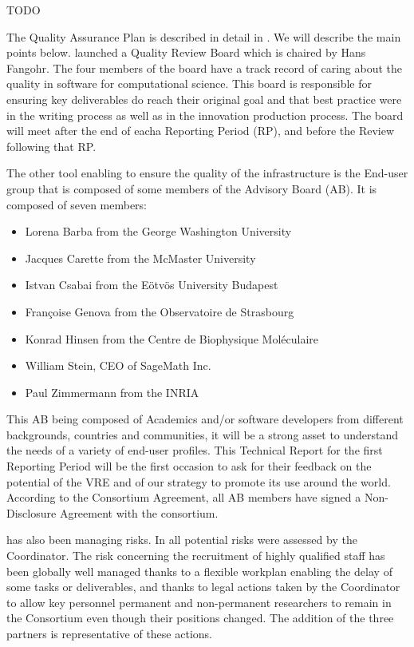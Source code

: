 \documentclass{deliverablereport}
\begin{document}
TODO

The Quality Assurance Plan is described in detail in . We will describe the main points below.
 launched a Quality Review Board which is chaired by Hans Fangohr. The four members of the board have a track record of caring about the quality in software for computational science. This board is responsible for ensuring key deliverables do reach their original goal and that best practice were in the writing process as well as in the innovation production process.
The board will meet after the end of eacha Reporting Period (RP), and before the Review following that RP.

The other tool enabling \ODK to ensure the quality of the infrastructure is the End-user group that is composed of some members of the Advisory Board (AB). It is composed of seven members:

\begin{itemize}
\item{Lorena Barba from the George Washington University}
\item{Jacques Carette from the McMaster University}
\item{Istvan Csabai from the Eötvös University Budapest}
\item{Françoise Genova from the Observatoire de Strasbourg}
\item{Konrad Hinsen from the Centre de Biophysique Moléculaire}
\item{William Stein, CEO of SageMath Inc.}
\item{Paul Zimmermann from the INRIA}
\end{itemize}

This AB being composed of Academics and/or software developers from different backgrounds, countries and communities, it will be a strong asset to understand the needs of a variety of end-user profiles. This Technical Report for the first Reporting Period will be the first occasion to ask for their feedback on the potential of the VRE and of our strategy to promote its use around the world.
According to the Consortium Agreement, all AB members have signed a Non-Disclosure Agreement with the consortium.

 has also been managing risks. In  all potential risks were assessed by the Coordinator. The risk concerning the recruitment of highly qualified staff has been globally well managed thanks to a flexible workplan enabling the delay of some tasks or deliverables, and thanks to legal actions taken by the Coordinator to allow key personnel permanent and non-permanent researchers to remain in the Consortium even though their positions changed. The addition of the three partners is representative of these actions.
\end{document}
